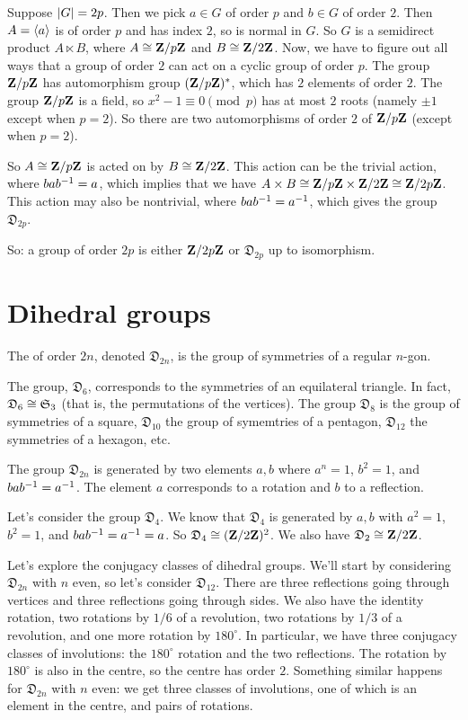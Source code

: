 \documentclass[11pt, twoside]{amsart}
\begin{document}
Suppose $\left \lvert G \right \rvert = 2p$. Then we pick $a\in G$ of order $p$ and $b\in G$ of order $2$. Then $A = \left \langle a \right \rangle$ is of order $p$ and has index $2$, so is normal in $G$. So $G$ is a semidirect product $A\ltimes B$, where $A\cong \mathbf{Z}/p\mathbf{Z}$ and $B\cong \mathbf{Z}/2\mathbf{Z} $. Now, we have to figure out all ways that a group of order $2$ can act on a cyclic group of order $p$. The group $\mathbf{Z}/p\mathbf{Z}$ has automorphism group $(\mathbf{Z}/p\mathbf{Z})^*$, which has $2$ elements of order $2$. The group $\mathbf{Z}/p\mathbf{Z}$ is a field, so $x^2 - 1 \equiv 0 \pmod p$ has at most $2$ roots (namely $\pm 1$ except when $p=2$). So there are two automorphisms of order $2$ of $\mathbf{Z}/p\mathbf{Z}$ (except when $p=2$).

So $A\cong \mathbf{Z}/p\mathbf{Z}$ is acted on by $B\cong \mathbf{Z}/2\mathbf{Z}$. This action can be the trivial action, where $bab^{-1} = a$, which implies that we have $A\times B \cong \mathbf{Z}/p\mathbf{Z}\times \mathbf{Z}/2\mathbf{Z}\cong \mathbf{Z}/2p\mathbf{Z}$. This action may also be nontrivial, where $bab^{-1}  =a^{-1}$, which gives the group $\mathfrak{D}_{2p}$.

So: a group of order $2p$ is either $\mathbf{Z}/2p\mathbf{Z}$ or $\mathfrak{D}_{2p}$ up to isomorphism.

\section{Dihedral groups}
\begin{definition}
The  of order $2n$, denoted $\mathfrak{D}_{2n}$, is the group of symmetries of a regular $n$-gon.
\end{definition}

The group, $\mathfrak{D}_6$, corresponds to the symmetries of an equilateral triangle. In fact, $\mathfrak{D}_6\cong \mathfrak{S}_3$ (that is, the permutations of the vertices). The group $\mathfrak{D}_8$ is the group of symmetries of a square, $\mathfrak{D}_{10}$ the group of symemtries of a pentagon, $\mathfrak{D}_{12}$ the symmetries of a hexagon, etc. 

The group $\mathfrak{D}_{2n}$ is generated by two elements $a,b$ where $a^n = 1$, $b^2 = 1$, and $bab^{-1} = a^{-1}$. The element $a$ corresponds to a rotation and $b$ to a reflection.

Let's consider the group $\mathfrak{D}_4$. We know that $\mathfrak{D}_4$ is generated by $a,b$ with $a^2 = 1$, $b^2=1$, and $bab^{-1} = a^{-1} = a$. So $\mathfrak{D}_4 \cong (\mathbf{Z}/2\mathbf{Z})^2$. We also have $\mathfrak{D}_2 \cong \mathbf{Z}/2\mathbf{Z}$.

Let's explore the conjugacy classes of dihedral groups. We'll start by considering $\mathfrak{D}_{2n}$ with $n$ even, so let's consider $\mathfrak{D}_{12}$. There are three reflections going through vertices and three reflections going through sides. We also have the identity rotation, two rotations by $1/6$ of a revolution, two rotations by $1/3$ of a revolution, and one more rotation by $180^\circ$. In particular, we have three conjugacy classes of involutions: the $180^\circ$ rotation and the two reflections. The rotation by $180^\circ$ is also in the centre, so the centre has order $2$. 
Something similar happens for $\mathfrak{D}_{2n}$ with $n$ even: we get three classes of involutions, one of which is an element in the centre, and pairs of rotations. 
\end{document}
